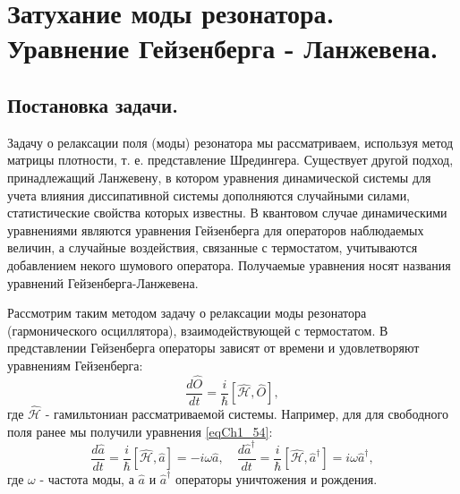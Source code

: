 \section{Затухание моды резонатора. Уравнение Гейзенберга - Ланжевена.}

\subsection{Постановка задачи.}
Задачу о релаксации поля (моды) резонатора мы рассматриваем, используя
метод матрицы плотности, т. е. представление Шредингера. Существует
другой подход, принадлежащий Ланжевену, в котором уравнения
динамической системы для учета влияния диссипативной системы
дополняются случайными силами, статистические свойства которых
известны. В квантовом случае динамическими уравнениями являются
уравнения Гейзенберга для операторов наблюдаемых величин, а случайные
воздействия, связанные с термостатом, учитываются добавлением некого
шумового оператора. Получаемые уравнения носят названия уравнений
Гейзенберга-Ланжевена.

Рассмотрим таким методом задачу о релаксации моды резонатора
(гармонического осциллятора), взаимодействующей с термостатом. В
представлении Гейзенберга операторы зависят от времени и удовлетворяют
уравнениям Гейзенберга:
\begin{equation}
\frac{d \hat{O}}{dt} = \frac{i}{\hbar}
\left[\hat{\mathcal{H}}, \hat{O}\right],
\nonumber
\end{equation}
где $\hat{\mathcal{H}}$ - гамильтониан рассматриваемой
системы. Например, для для свободного поля ранее мы получили уравнения
\eqref{eqCh1_54}:
\begin{equation}
\frac{d \hat{a}}{d t} = \frac{i}{\hbar}\left[\hat{\mathcal{H}},
  \hat{a}\right] = -i \omega \hat{a}, \quad
\frac{d \hat{a}^{\dag}}{dt} = \frac{i}{\hbar}\left[\hat{\mathcal{H}},
  \hat{a}^{\dag}\right] = i \omega \hat{a}^{\dag},
\nonumber
\end{equation}
где $\omega$ - частота моды, а $\hat{a}$ и $\hat{a}^{\dag}$ операторы
уничтожения и рождения.



